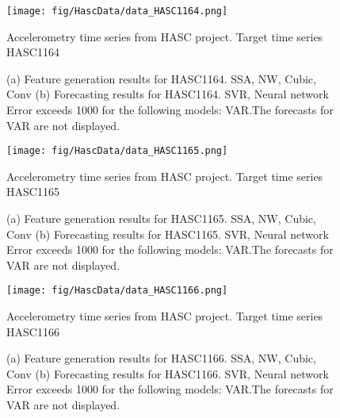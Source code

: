\documentclass[12pt]{article}
\begin{document}
\begin{figure}
\centering
\texttt{[image: fig/HascData/data\_HASC1164.png]}
\caption{Accelerometry time series from HASC project. Target time series	HASC1164	}
\end{figure}


\begin{figure}
\centering
{}
\caption{(a)	Feature generation results for	HASC1164.	SSA, NW, Cubic, Conv	(b)	Forecasting results for	HASC1164.	SVR, Neural network	Error exceeds 1000 for the following models: VAR.The forecasts for VAR are not displayed.	}
\end{figure}


\begin{figure}
\centering
\texttt{[image: fig/HascData/data\_HASC1165.png]}
\caption{Accelerometry time series from HASC project. Target time series	HASC1165	}
\end{figure}


\begin{figure}
\centering
{}
\caption{(a)	Feature generation results for	HASC1165.	SSA, NW, Cubic, Conv	(b)	Forecasting results for	HASC1165.	SVR, Neural network	Error exceeds 1000 for the following models: VAR.The forecasts for VAR are not displayed.	}
\end{figure}


\begin{figure}
\centering
\texttt{[image: fig/HascData/data\_HASC1166.png]}
\caption{Accelerometry time series from HASC project. Target time series	HASC1166	}
\end{figure}


\begin{figure}
\centering
{}
\caption{(a)	Feature generation results for	HASC1166.	SSA, NW, Cubic, Conv	(b)	Forecasting results for	HASC1166.	SVR, Neural network	Error exceeds 1000 for the following models: VAR.The forecasts for VAR are not displayed.	}
\end{figure}
\end{document}
